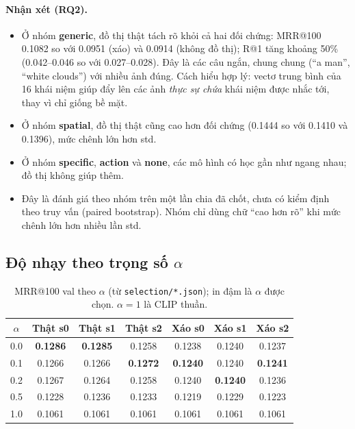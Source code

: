 \documentclass[12pt, a4paper]{article}
\makeatletter
\newcommand{\code}[1]{\texttt{#1}}
\newcommand{\mrr}{MRR@100}
\makeatother
\begin{document}
\paragraph{Nhận xét (RQ2).}
\begin{itemize}
\item Ở nhóm \textbf{generic}, đồ thị thật tách rõ khỏi cả hai đối chứng: \mrr{} 0.1082 so với 0.0951 (xáo) và 0.0914 (không đồ thị); R@1 tăng khoảng 50\% (0.042--0.046 so với 0.027--0.028). Đây là các câu ngắn, chung chung (``a man'', ``white clouds'') với nhiều ảnh đúng. Cách hiểu hợp lý: vectơ trung bình của 16 khái niệm giúp đẩy lên các ảnh \emph{thực sự chứa} khái niệm được nhắc tới, thay vì chỉ giống bề mặt.
\item Ở nhóm \textbf{spatial}, đồ thị thật cũng cao hơn đối chứng (0.1444 so với 0.1410 và 0.1396), mức chênh lớn hơn std.
\item Ở nhóm \textbf{specific}, \textbf{action} và \textbf{none}, các mô hình có học gần như ngang nhau; đồ thị không giúp thêm.
\item Đây là đánh giá theo nhóm trên một lần chia đã chốt, chưa có kiểm định theo truy vấn (paired bootstrap). Nhóm chỉ dùng chữ ``cao hơn rõ'' khi mức chênh lớn hơn nhiều lần std.
\end{itemize}

\subsection{Độ nhạy theo trọng số $\alpha$}
\begin{table}[H]
\centering\small
\caption{\mrr{} val theo $\alpha$ (từ \code{selection/*.json}); in đậm là $\alpha$ được chọn. $\alpha = 1$ là CLIP thuần.}
\label{tab:alpha}
{\begin{tabular}{c c c c c c c}
\toprule
$\alpha$ & Thật s0 & Thật s1 & Thật s2 & Xáo s0 & Xáo s1 & Xáo s2 \\
\midrule
0.0 & \textbf{0.1286} & \textbf{0.1285} & 0.1258 & 0.1238 & 0.1240 & 0.1237 \\
0.1 & 0.1266 & 0.1266 & \textbf{0.1272} & \textbf{0.1240} & 0.1240 & \textbf{0.1241} \\
0.2 & 0.1267 & 0.1264 & 0.1258 & 0.1240 & \textbf{0.1240} & 0.1236 \\
0.5 & 0.1228 & 0.1236 & 0.1233 & 0.1219 & 0.1229 & 0.1223 \\
1.0 & 0.1061 & 0.1061 & 0.1061 & 0.1061 & 0.1061 & 0.1061 \\
\bottomrule
\end{tabular}}
\end{table}
\end{document}
